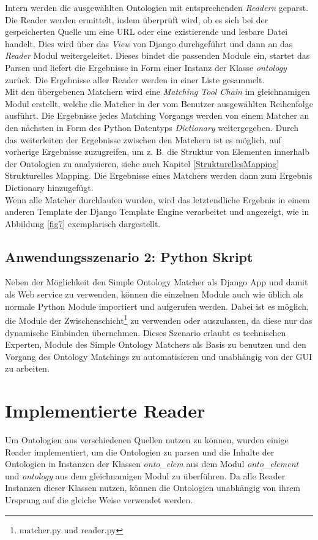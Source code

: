 		Intern werden die ausgewählten Ontologien mit entsprechenden
		\textit{Readern} geparst. Die Reader werden ermittelt, indem überprüft wird,
		ob es sich bei der gespeicherten Quelle um eine URL oder eine
		existierende und lesbare Datei handelt. Dies wird über das \textit{View} von
		Django durchgeführt und dann an das \textit{Reader} Modul weitergeleitet. Dieses
		bindet die passenden Module ein, startet das Parsen und liefert die Ergebnisse
		in Form einer Instanz der Klasse \textit{ontology} zurück. Die Ergebnisse
		aller Reader werden in einer Liste gesammelt.\\
		Mit den übergebenen Matchern wird eine \textit{Matching Tool Chain} im
		gleichnamigen Modul erstellt, welche die Matcher in der vom
		Benutzer ausgewählten Reihenfolge ausführt. Die Ergebnisse jedes Matching
		Vorgangs werden von einem Matcher an den nächsten in Form des Python Datentyps \textit{Dictionary}
		weitergegeben. Durch das weiterleiten der Ergebnisse zwischen den Matchern
		ist es möglich, auf vorherige Ergebnisse zuzugreifen, um z. B. die Struktur von
		Elementen innerhalb der Ontologien zu analysieren,
		siehe auch Kapitel \ref{StrukturellesMapping} Strukturelles Mapping.
		Die Ergebnisse eines Matchers werden dann zum Ergebnis Dictionary
		hinzugefügt.\\
		Wenn alle Matcher durchlaufen wurden, wird das letztendliche Ergebnis in einem
		anderen Template der Django Template Engine verarbeitet und angezeigt,
		wie in Abbildung \ref{fig7} exemplarisch dargestellt.
		
		\subsection{Anwendungsszenario 2: Python Skript}
		Neben der Möglichkeit den Simple Ontology Matcher als Django App und damit als
		Web service zu verwenden, können die einzelnen Module auch wie üblich als
		normale Python Module importiert und aufgerufen werden. Dabei ist es möglich, die Module der
		Zwischenschicht\footnote{matcher.py und reader.py} zu verwenden oder
		auszulassen, da diese nur das dynamische Einbinden übernehmen. Dieses
		Szenario erlaubt es technischen Experten, Module des Simple Ontology Matchers
		als Basis zu benutzen und den Vorgang des Ontology Matchings zu
		automatisieren und unabhängig von der GUI zu arbeiten.
		
		\section{Implementierte Reader}
		Um Ontologien aus verschiedenen Quellen nutzen zu können, wurden einige Reader
		implementiert, um die Ontologien zu parsen und die Inhalte der Ontologien in
		Instanzen der Klassen \textit{onto\_elem} aus dem Modul \textit{onto\_element}
		und \textit{ontology} aus dem gleichnamigen Modul zu überführen. Da alle
		Reader Instanzen dieser Klassen nutzen, können die Ontologien unabhängig von
		ihrem Ursprung auf die gleiche Weise verwendet werden.
		
